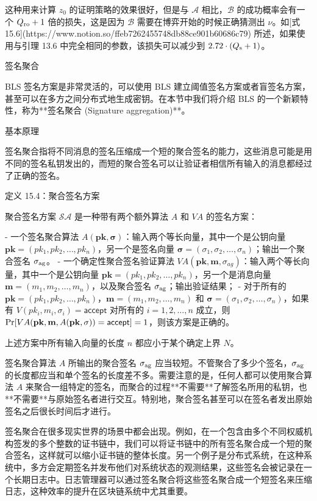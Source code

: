 这种用来计算 $z_0$ 的证明策略的效果很好，但是与 $\mathcal{A}$ 相比，$\mathcal{B}$ 的成功概率会有一个 $Q_{\rm ro}+1$ 倍的损失，这是因为 $\mathcal{B}$ 需要在博弈开始的时候正确猜测出 $\nu$。如[式 15.6](https://www.notion.so/ffeb7262455748db88ce901b60686c79) 所述，如果使用与引理 13.6 中完全相同的参数，该损失可以减少到 $2.72\cdot(Q_{\rm s}+1)$。

签名聚合

BLS 签名方案是非常灵活的，可以使用 BLS 建立阈值签名方案或者盲签名方案，甚至可以在多方之间分布式地生成密钥。在本节中我们将介绍 BLS 的一个新颖特性，称为**签名聚合 (Signature aggregation)**。

基本原理

签名聚合指将不同消息的签名压缩成一个短的聚合签名的能力，这些消息可能是用不同的签名私钥发出的，而短的聚合签名可以让验证者相信所有输入的消息都经过了正确的签名。

定义 15.4：聚合签名方案

聚合签名方案 $\mathcal{SA}$ 是一种带有两个额外算法 $A$ 和 $VA$ 的签名方案：

- 一个签名聚合算法 $A(\mathbf{pk},\mathbf{\sigma})$：输入两个等长向量，其中一个是公钥向量 $\mathbf{pk}=(pk_1,pk_2,\dots, pk_n)$，另一个是签名向量 $\mathbf{\sigma}=(\sigma_1, \sigma_2, \dots, \sigma_n)$；输出一个聚合签名 $\sigma_{\rm ag}$。
- 一个确定性聚合签名验证算法 $VA(\mathbf{pk},\mathbf{m},\sigma_{ag})$：输入两个等长向量，其中一个是公钥向量 $\mathbf{pk}=(pk_1,pk_2,\dots, pk_n)$，另一个是消息向量 $\mathbf{m}=(m_1, m_2, \dots, m_n)$，以及聚合签名 $\sigma_{\rm ag}$；输出验证结果；
- 对于所有的 $\mathbf{pk}=(pk_1,pk_2,\dots, pk_n)$，$\mathbf{m}=(m_1, m_2, \dots, m_n)$ 和 $\mathbf{\sigma}=(\sigma_1, \sigma_2, \dots, \sigma_n)$，如果有 $V(pk_i,m_i,\sigma_i)=\mathsf{accept}$ 对所有的 $i=1,2,\dots,n$ 成立，则 ${\rm Pr}[VA(\mathbf{pk},\mathbf{m},A(\mathbf{pk},\mathbf{\sigma}))=\mathsf{accept}]=1$，则该方案是正确的。

上述方案中所有输入向量的长度 $n$ 都应小于某个确定上界 $N$。

签名聚合算法 $A$ 所输出的聚合签名 $\sigma_{\rm ag}$ 应当较短。不管聚合了多少个签名，$\sigma_{\rm ag}$ 的长度都应当和单个签名的长度差不多。需要注意的是，任何人都可以使用聚合算法 $A$ 来聚合一组特定的签名，而聚合的过程**不需要**了解签名所用的私钥，也**不需要**与原始签名者进行交互。特别地，聚合签名甚至可以在签名者发出原始签名之后很长时间后才进行。

签名聚合在很多现实世界的场景中都会出现。例如，在一个包含由多个不同权威机构签发的多个整数的证书链中，我们可以将证书链中的所有签名聚合成一个短的聚合签名，这样就可以缩小证书链的整体长度。另一个例子是分布式系统，在这种系统中，多方会定期签名并发布他们对系统状态的观测结果，这些签名会被记录在一个长期日志中。日志管理器可以通过签名聚合将这些签名聚合成一个短签名来压缩日志，这种效率的提升在区块链系统中尤其重要。

